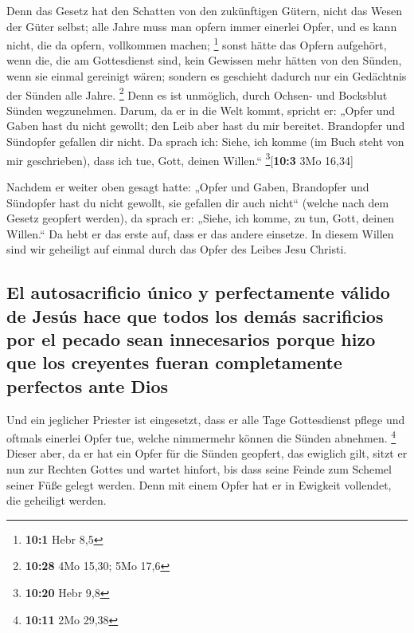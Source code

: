  Denn das Gesetz hat den Schatten von den zukünftigen
Gütern, nicht das Wesen der Güter selbst; alle Jahre muss man opfern
immer einerlei Opfer, und es kann nicht, die da opfern, vollkommen
machen; \footnote{\textbf{10:1} Hebr 8,5}  sonst hätte das
Opfern aufgehört, wenn die, die am Gottesdienst sind, kein Gewissen mehr
hätten von den Sünden, wenn sie einmal gereinigt wären; 
sondern es geschieht dadurch nur ein Gedächtnis der Sünden alle Jahre.
\footnote{\textbf{10:28} 4Mo 15,30; 5Mo 17,6}  Denn es ist
unmöglich, durch Ochsen- und Bocksblut Sünden wegzunehmen.
 Darum, da er in die Welt kommt, spricht er: „Opfer und
Gaben hast du nicht gewollt; den Leib aber hast du mir bereitet.
 Brandopfer und Sündopfer gefallen dir nicht.
 Da sprach ich: Siehe, ich komme (im Buch steht von mir
geschrieben), dass ich tue, Gott, deinen Willen.``
\footnote{\textbf{10:20} Hebr 9,8}{[}\textbf{10:3} 3Mo 16,34{]}

 Nachdem er weiter oben gesagt hatte: „Opfer und Gaben,
Brandopfer und Sündopfer hast du nicht gewollt, sie gefallen dir auch
nicht`` (welche nach dem Gesetz geopfert werden),  da
sprach er: „Siehe, ich komme, zu tun, Gott, deinen Willen.`` Da hebt er
das erste auf, dass er das andere einsetze.  In diesem
Willen sind wir geheiligt auf einmal durch das Opfer des Leibes Jesu
Christi.

\hypertarget{el-autosacrificio-uxfanico-y-perfectamente-vuxe1lido-de-jesuxfas-hace-que-todos-los-demuxe1s-sacrificios-por-el-pecado-sean-innecesarios-porque-hizo-que-los-creyentes-fueran-completamente-perfectos-ante-dios}{%
\subsection{El autosacrificio único y perfectamente válido de Jesús hace
que todos los demás sacrificios por el pecado sean innecesarios porque
hizo que los creyentes fueran completamente perfectos ante
Dios}\label{el-autosacrificio-uxfanico-y-perfectamente-vuxe1lido-de-jesuxfas-hace-que-todos-los-demuxe1s-sacrificios-por-el-pecado-sean-innecesarios-porque-hizo-que-los-creyentes-fueran-completamente-perfectos-ante-dios}}

 Und ein jeglicher Priester ist eingesetzt, dass er alle
Tage Gottesdienst pflege und oftmals einerlei Opfer tue, welche
nimmermehr können die Sünden abnehmen. \footnote{\textbf{10:11} 2Mo
  29,38}  Dieser aber, da er hat ein Opfer für die Sünden
geopfert, das ewiglich gilt, sitzt er nun zur Rechten Gottes
 und wartet hinfort, bis dass seine Feinde zum Schemel
seiner Füße gelegt werden.  Denn mit einem Opfer hat er
in Ewigkeit vollendet, die geheiligt werden.

